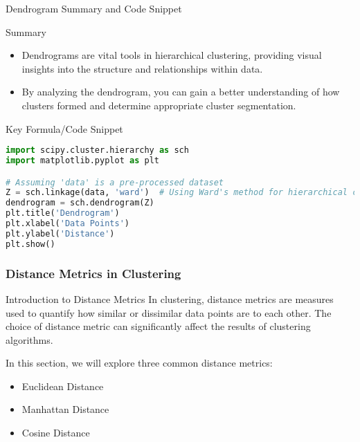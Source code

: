 \documentclass[aspectratio=169]{beamer}
\begin{document}
\begin{frame}[fragile]{Dendrogram Summary and Code Snippet}
    \begin{block}{Summary}
        \begin{itemize}
            \item Dendrograms are vital tools in hierarchical clustering, providing visual insights into the structure and relationships within data.
            \item By analyzing the dendrogram, you can gain a better understanding of how clusters formed and determine appropriate cluster segmentation.
        \end{itemize}
    \end{block}
    
    \begin{block}{Key Formula/Code Snippet}
        \begin{lstlisting}[language=Python]
import scipy.cluster.hierarchy as sch
import matplotlib.pyplot as plt

# Assuming 'data' is a pre-processed dataset
Z = sch.linkage(data, 'ward')  # Using Ward's method for hierarchical clustering
dendrogram = sch.dendrogram(Z)
plt.title('Dendrogram')
plt.xlabel('Data Points')
plt.ylabel('Distance')
plt.show()
        \end{lstlisting}
    \end{block}
\end{frame}

\begin{frame}[fragile]
    \frametitle{Distance Metrics in Clustering}
    
    \begin{block}{Introduction to Distance Metrics}
        In clustering, distance metrics are measures used to quantify how similar or dissimilar data points are to each other. The choice of distance metric can significantly affect the results of clustering algorithms.
    \end{block}
    In this section, we will explore three common distance metrics:
    \begin{itemize}
        \item Euclidean Distance
        \item Manhattan Distance
        \item Cosine Distance
    \end{itemize}
\end{frame}
\end{document}
